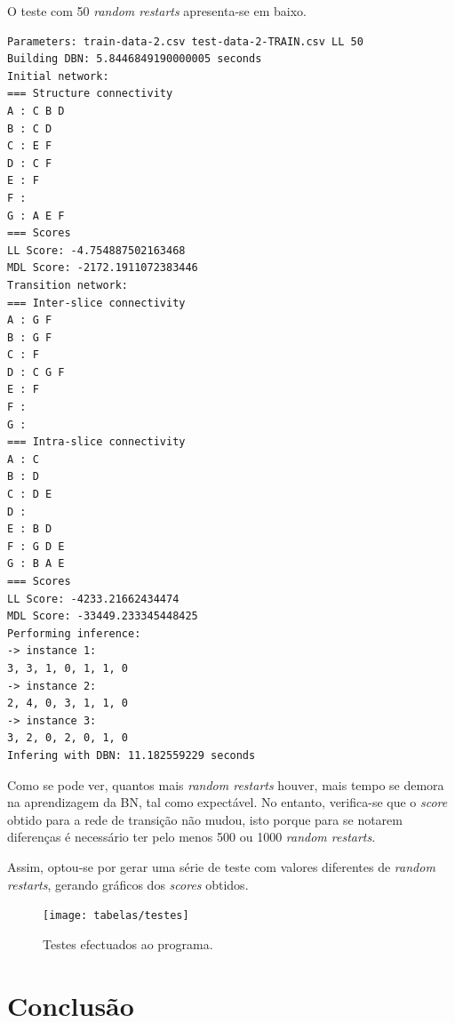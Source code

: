 \documentclass[10pt]{article}
\numberwithin{equation}{section}
\begin{document}
O teste com 50 \textit{random restarts} apresenta-se em baixo.

\begin{lstlisting}
Parameters: train-data-2.csv test-data-2-TRAIN.csv LL 50
Building DBN: 5.8446849190000005 seconds
Initial network: 
=== Structure connectivity
A : C B D 
B : C D 
C : E F 
D : C F 
E : F 
F : 
G : A E F 
=== Scores
LL Score: -4.754887502163468
MDL Score: -2172.1911072383446
Transition network: 
=== Inter-slice connectivity
A : G F 
B : G F 
C : F 
D : C G F 
E : F 
F : 
G : 
=== Intra-slice connectivity
A : C 
B : D 
C : D E 
D : 
E : B D 
F : G D E 
G : B A E 
=== Scores
LL Score: -4233.21662434474
MDL Score: -33449.233345448425
Performing inference:
-> instance 1: 
3, 3, 1, 0, 1, 1, 0
-> instance 2: 
2, 4, 0, 3, 1, 1, 0
-> instance 3: 
3, 2, 0, 2, 0, 1, 0
Infering with DBN: 11.182559229 seconds
\end{lstlisting}

Como se pode ver, quantos mais \textit{random restarts} houver, mais tempo se demora na aprendizagem da BN, tal como expectável. No entanto, verifica-se que o \textit{score} obtido para a rede de transição não mudou, isto porque para se notarem diferenças é necessário ter pelo menos 500 ou 1000 \textit{random restarts}.

Assim, optou-se por gerar uma série de teste com valores diferentes de \textit{random restarts}, gerando gráficos dos \textit{scores} obtidos.

\begin{figure}[H]
	\centering
	\texttt{[image: tabelas/testes]}
	\caption{Testes efectuados ao programa.}
	\vspace{-0.8em}
\end{figure}



\section{Conclusão}
\end{document}
